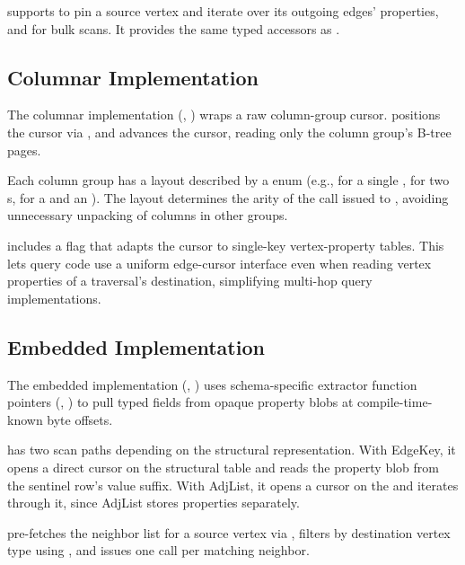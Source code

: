  supports  to pin a source vertex and iterate over its outgoing edges' properties, and  for bulk scans.
It provides the same typed accessors as .

\subsection{Columnar Implementation}
\label{arch:prop-cursors:columnar}

The columnar implementation (, ) wraps a raw \wt{} column-group cursor.
 positions the cursor via , and  advances the \wt{} cursor, reading only the column group's B-tree pages.

Each column group has a layout described by a  enum (e.g.,  for a single ,  for two s,  for a  and an ).
The layout determines the arity of the  call issued to \wt{}, avoiding unnecessary unpacking of columns in other groups.

 includes a  flag that adapts the cursor to single-key vertex-property tables.
This lets query code use a uniform edge-cursor interface even when reading vertex properties of a traversal's destination, simplifying multi-hop query implementations.

\subsection{Embedded Implementation}
\label{arch:prop-cursors:embedded}

The embedded implementation (, ) uses schema-specific extractor function pointers (, ) to pull typed fields from opaque property blobs at compile-time-known byte offsets.

 has two scan paths depending on the structural representation.
With EdgeKey, it opens a direct \wt{} cursor on the structural table and reads the property blob from the sentinel row's value suffix.
With AdjList, it opens a cursor on the  and iterates through it, since AdjList stores properties separately.

 pre-fetches the neighbor list for a source vertex via , filters by destination vertex type using , and issues one  call per matching neighbor.


